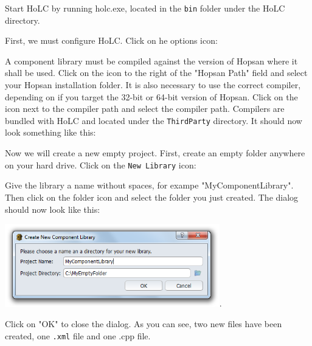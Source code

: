 \documentclass[a4paper,pdftex]{article}
\begin{document}
\begin{tutenumerate}
Start HoLC by running holc.exe, located in the \texttt{bin} folder under the HoLC directory.

First, we must configure HoLC. Click on he options icon:


A component library must be compiled against the version of Hopsan where it shall be used. 
Click on the icon to the right of the "Hopsan Path" field and select your Hopsan installation folder.
It is also necessary to use the correct compiler, depending on if you target the 32-bit or 64-bit version of Hopsan.
Click on the icon next to the compiler path and select the compiler path. 
Compilers are bundled with HoLC and located under the \texttt{ThirdParty} directory.
It should now look something like this:


Now we will create a new empty project. 
First, create an empty folder anywhere on your hard drive.
Click on the \texttt{New Library} icon:


Give the library a name without spaces, for exampe "MyComponentLibrary".
Then click on the folder icon and select the folder you just created.
The dialog should now look like this:

\includegraphics[width=0.7\textwidth]{gfx/writingcomponents/newlibrarydialog.png}.

Click on "OK" to close the dialog.
As you can see, two new files have been created, one \texttt{.xml} file and one .cpp file.


\end{tutenumerate}
\end{document}

